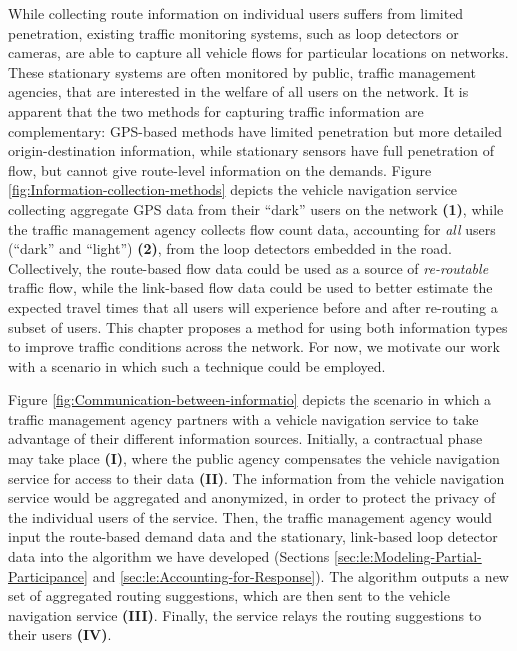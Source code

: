 While collecting route information on individual users suffers from
limited penetration, existing traffic monitoring systems, such as
loop detectors or cameras, are able to capture all vehicle flows for
particular locations on networks. These stationary systems are often
monitored by public, traffic management agencies, that are interested
in the welfare of all users on the network. It is apparent that the
two methods for capturing traffic information are complementary: GPS-based
methods have limited penetration but more detailed origin-destination
information, while stationary sensors have full penetration of flow,
but cannot give route-level information on the demands. Figure \ref{fig:Information-collection-methods}
depicts the vehicle navigation service collecting aggregate GPS data
from their ``dark'' users on the network \textbf{(1)}, while the
traffic management agency collects flow count data, accounting for
\emph{all} users (``dark'' and ``light'') \textbf{(2)}, from the
loop detectors embedded in the road. Collectively, the route-based
flow data could be used as a source of \emph{re-routable }traffic
flow, while the link-based flow data could be used to better estimate
the expected travel times that all users will experience before and
after re-routing a subset of users. This chapter proposes a method
for using both information types to improve traffic conditions across
the network. For now, we motivate our work with a scenario in which
such a technique could be employed.

Figure \ref{fig:Communication-between-informatio} depicts the scenario
in which a traffic management agency partners with a vehicle navigation
service to take advantage of their different information sources.
Initially, a contractual phase may take place \textbf{(I)}, where
the public agency compensates the vehicle navigation service for access
to their data \textbf{(II)}. The information from the vehicle navigation
service would be aggregated and anonymized, in order to protect the
privacy of the individual users of the service. Then, the traffic
management agency would input the route-based demand data and the
stationary, link-based loop detector data into the algorithm we have
developed (Sections \ref{sec:le:Modeling-Partial-Participance} and \ref{sec:le:Accounting-for-Response}).
The algorithm outputs a new set of aggregated routing suggestions,
which are then sent to the vehicle navigation service \textbf{(III)}.
Finally, the service relays the routing suggestions to their users
\textbf{(IV)}. 

